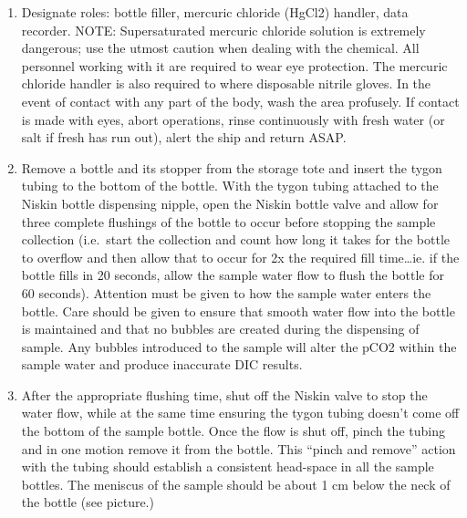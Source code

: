 \documentclass[]{book}
\providecommand{\tightlist}{%
  \setlength{\itemsep}{0pt}\setlength{\parskip}{0pt}}
\begin{document}
\begin{enumerate}
\def\labelenumi{\arabic{enumi}.}
\tightlist
\item
  Designate roles: bottle filler, mercuric chloride (HgCl2) handler, data recorder. NOTE: Supersaturated mercuric chloride solution is extremely dangerous; use the utmost caution when dealing with the chemical. All personnel working with it are required to wear eye protection. The mercuric chloride handler is also required to where disposable nitrile gloves. In the event of contact with any part of the body, wash the area profusely. If contact is made with eyes, abort operations, rinse continuously with fresh water (or salt if fresh has run out), alert the ship and return ASAP.
\item
  Remove a bottle and its stopper from the storage tote and insert the tygon tubing to the bottom of the bottle. With the tygon tubing attached to the Niskin bottle dispensing nipple, open the Niskin bottle valve and allow for three complete flushings of the bottle to occur before stopping the sample collection (i.e.~start the collection and count how long it takes for the bottle to overflow and then allow that to occur for 2x the required fill time\ldots ie. if the bottle fills in 20 seconds, allow the sample water flow to flush the bottle for 60 seconds). Attention must be given to how the sample water enters the bottle. Care should be given to ensure that smooth water flow into the bottle is maintained and that no bubbles are created during the dispensing of sample. Any bubbles introduced to the sample will alter the pCO2 within the sample water and produce inaccurate DIC results.
\item
  After the appropriate flushing time, shut off the Niskin valve to stop the water flow, while at the same time ensuring the tygon tubing doesn't come off the bottom of the sample bottle. Once the flow is shut off, pinch the tubing and in one motion remove it from the bottle. This ``pinch and remove'' action with the tubing should establish a consistent head-space in all the sample bottles. The meniscus of the sample should be about 1 cm below the neck of the bottle (see picture.)
\end{enumerate}
\end{document}
